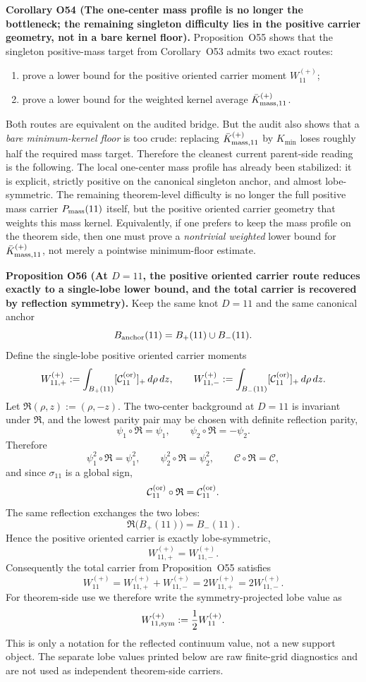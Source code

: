 \documentclass[aps,prd,onecolumn,notitlepage,nofootinbib,superscriptaddress,11pt,floatfix]{revtex4-2}
\begin{document}
\medskip\noindent\textbf{Corollary O54 (The one-center mass profile is no longer the bottleneck; the remaining singleton difficulty lies in the positive carrier geometry, not in a bare kernel floor).}
Proposition~O55 shows that the singleton positive-mass target from Corollary~O53 admits two exact routes:
\begin{enumerate}
\item prove a lower bound for the positive oriented carrier moment \(W_{11}^{(+)}\);
\item prove a lower bound for the weighted kernel average \(\bar K_{{\rm mass},11}^{(+)}\).
\end{enumerate}
Both routes are equivalent on the audited bridge.  But the audit also shows that a \emph{bare minimum-kernel floor} is too crude: replacing \(\bar K_{{\rm mass},11}^{(+)}\) by \(K_{\min}\) loses roughly half the required mass target.  Therefore the cleanest current parent-side reading is the following.  The local one-center mass profile has already been stabilized: it is explicit, strictly positive on the canonical singleton anchor, and almost lobe-symmetric.  The remaining theorem-level difficulty is no longer the full positive mass carrier \(P_{\rm mass}(11)\) itself, but the positive oriented carrier geometry that weights this mass kernel.  Equivalently, if one prefers to keep the mass profile on the theorem side, then one must prove a \emph{nontrivial weighted} lower bound for \(\bar K_{{\rm mass},11}^{(+)}\), not merely a pointwise minimum-floor estimate.

\medskip\noindent\textbf{Proposition O56 (At \(D=11\), the positive oriented carrier route reduces exactly to a single-lobe lower bound, and the total carrier is recovered by reflection symmetry).}
Keep the same knot \(D=11\) and the same canonical anchor
\[
B_{\rm anchor}(11)=B_+(11)\cup B_-(11).
\]
Define the single-lobe positive oriented carrier moments
\[
W_{11,+}^{(+)}
:=
\int_{B_+(11)}[\mathcal C_{11}^{\rm(or)}]_+\,d\rho\,dz,
\qquad
W_{11,-}^{(+)}
:=
\int_{B_-(11)}[\mathcal C_{11}^{\rm(or)}]_+\,d\rho\,dz.
\]
Let \(\mathfrak R(\rho,z):=(\rho,-z)\).  The two-center background at \(D=11\) is invariant under \(\mathfrak R\), and the lowest parity pair may be chosen with definite reflection parity,
\[
\psi_1\circ\mathfrak R=\psi_1,
\qquad
\psi_2\circ\mathfrak R=-\psi_2.
\]
Therefore
\[
\psi_1^2\circ\mathfrak R=\psi_1^2,
\qquad
\psi_2^2\circ\mathfrak R=\psi_2^2,
\qquad
\mathcal C\circ\mathfrak R=\mathcal C,
\]
and since \(\sigma_{11}\) is a global sign,
\[
\mathcal C_{11}^{\rm(or)}\circ\mathfrak R=\mathcal C_{11}^{\rm(or)}.
\]
The same reflection exchanges the two lobes:
\[
\mathfrak R\bigl(B_+(11)\bigr)=B_-(11).
\]
Hence the positive oriented carrier is exactly lobe-symmetric,
\[
W_{11,+}^{(+)}=W_{11,-}^{(+)}.
\]
Consequently the total carrier from Proposition~O55 satisfies
\[
W_{11}^{(+)}
=
W_{11,+}^{(+)}+W_{11,-}^{(+)}
=
2W_{11,+}^{(+)}
=
2W_{11,-}^{(+)}.
\]
For theorem-side use we therefore write the symmetry-projected lobe value as
\[
W_{11,{\rm sym}}^{(+)}:=\frac12 W_{11}^{(+)}.
\]
This is only a notation for the reflected continuum value, not a new support object.  The separate lobe values printed below are raw finite-grid diagnostics and are not used as independent theorem-side carriers.
\end{document}
